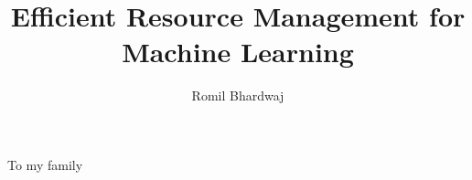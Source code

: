\documentclass[oldfontcommands]{ucbthesis}
\begin{document}
	
	
	\title{Efficient Resource Management for Machine Learning}
	\author{Romil Bhardwaj}
	
	\maketitle
	\copyrightpage
	
	
	
	\begin{frontmatter}
		
		\begin{dedication}
			\null\vfil
			\begin{center}
				To my family
			\end{center}
			\vfil\null
		\end{dedication}
		
		
		\tableofcontents
		\clearpage
		\listoffigures
		\clearpage
		\listoftables
		
		
		
	\end{frontmatter}
	
\end{document}
